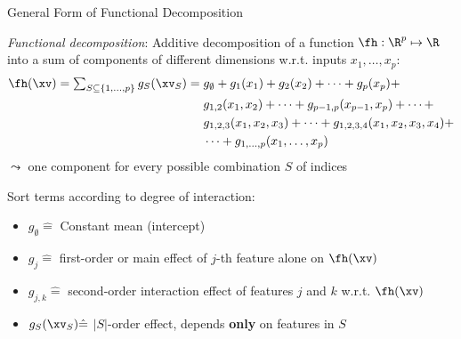 \documentclass[11pt,compress,t,notes=noshow, aspectratio=169, xcolor=table]{beamer}
\newcommand{\open}{}
\newcommand{\close}{}
\begin{document}
\begin{frame}{General Form of Functional Decomposition
}


\begin{definition}
\textit{Functional decomposition}: Additive decomposition of a function $\fh: \R^p \mapsto \R$ into a sum of components of different dimensions w.r.t. inputs $x_1, \ldots, x_p$: \\
\begin{equation}
\begin{split}
\fh(\xv) = 
\textstyle\sum_{S \subseteq \{1,\ldots,p\}} g_{S}(\xv_S) = \; & g_{\open \emptyset \close} + g_{\open 1 \close}(x_1) + g_{\open 2 \close}(x_2) + \dots + g_{\open p \close}(x_p) + \\
& g_{\open 1, 2 \close}(x_1, x_2) + \dots + g_{\open p-1, p \close}(x_{p-1}, x_p) + \dots + \\
& g_{\open 1, 2, 3 \close}(x_1, x_2, x_3) + \dots + g_{\open 1, 2, 3, 4 \close}(x_1, x_2, x_3, x_4) + \\
& \dots + g_{\open 1,\ldots,p \close}(x_1, \ldots, x_p)
\end{split}
\end{equation}
$\leadsto$ one component for every possible combination $S$ of indices
\end{definition}
Sort terms according to degree of interaction:
\begin{itemize}
\item $g_{\open \emptyset \close} \hat = $ Constant mean (intercept) %
\item $g_{\open j \close} \hat = $ first-order or main effect of $j$-th feature alone on $\fh(\xv)$
\item $g_{\open j, k \close} \hat = $ second-order interaction effect of features $j$ and $k$ w.r.t. $\fh(\xv)$%
\item $g_{S}(\xv_S) \hat = $ $|S|$-order effect, depends \textbf{only} on features in $S$ %
\end{itemize}
\lz
\end{frame}
\end{document}
